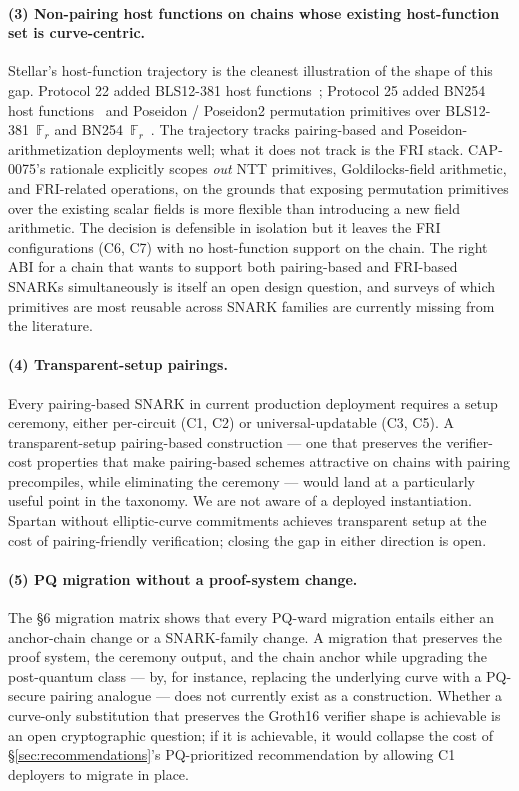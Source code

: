 \paragraph{(3) Non-pairing host functions on chains whose existing
host-function set is curve-centric.}
\label{sec:open-host}
Stellar's host-function trajectory is the cleanest illustration of the
shape of this gap. Protocol 22 added {BLS12-381} host
functions~\cite{stellar-cap-0059}; Protocol 25 added {BN254}
host functions~\cite{stellar-cap-0074} and Poseidon / Poseidon2
permutation primitives over {BLS12-381}~$\mathbb{F}_r$ and
{BN254}~$\mathbb{F}_r$~\cite{stellar-cap-0075}. The
trajectory tracks pairing-based and Poseidon-arithmetization
deployments well; what it does not track is the FRI stack.
{CAP-0075}'s rationale explicitly scopes \emph{out} {NTT}
primitives, Goldilocks-field arithmetic, and FRI-related operations,
on the grounds that exposing permutation primitives over the
existing scalar fields is more flexible than introducing a new field
arithmetic. The decision is defensible in isolation but it leaves
the FRI configurations (C6, C7) with no host-function support on the
chain. The right ABI for a chain that wants to support both
pairing-based and FRI-based SNARKs simultaneously is itself an open
design question, and surveys of which primitives are most reusable
across SNARK families are currently missing from the literature.

\paragraph{(4) Transparent-setup pairings.} Every pairing-based
SNARK in current production deployment requires a setup ceremony,
either per-circuit (C1, C2) or universal-updatable (C3, C5). A
transparent-setup pairing-based construction --- one that preserves
the verifier-cost properties that make pairing-based schemes
attractive on chains with pairing precompiles, while eliminating the
ceremony --- would land at a particularly useful point in the
taxonomy. We are not aware of a deployed instantiation. Spartan
without elliptic-curve commitments achieves transparent setup at the
cost of pairing-friendly verification; closing the gap in either
direction is open.

\paragraph{(5) PQ migration without a proof-system change.} The §6
migration matrix shows that every PQ-ward migration entails either an
anchor-chain change or a SNARK-family change. A migration that
preserves the proof system, the ceremony output, and the chain
anchor while upgrading the post-quantum class --- by, for instance,
replacing the underlying curve with a PQ-secure pairing analogue ---
does not currently exist as a construction. Whether a curve-only
substitution that preserves the Groth16 verifier shape is achievable
is an open cryptographic question; if it is achievable, it would
collapse the cost of \S\ref{sec:recommendations}'s
PQ-prioritized recommendation by allowing C1 deployers to migrate in
place.

